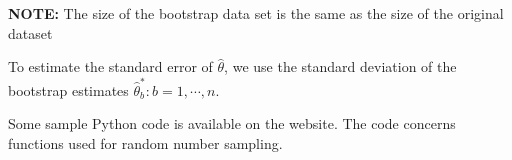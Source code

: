 \documentclass[12pt]{article}
\begin{document}
\textbf{NOTE:} The size of the bootstrap data set is the same as the size of the original dataset

To estimate the standard error of $\hat{\theta}$, we use the standard deviation of the bootstrap estimates $\hat{\theta}^*_b: b=1,\cdots, n$.

Some sample Python code is available on the website. The code concerns functions used for random number sampling.
\end{document}
